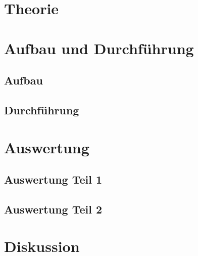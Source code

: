 \section {Theorie}

\section {Aufbau und Durchführung}

  \subsection {Aufbau}

  \subsection {Durchführung}

\section {Auswertung}

  \subsection {Auswertung Teil 1}

  \subsection {Auswertung Teil 2}

\section {Diskussion}
